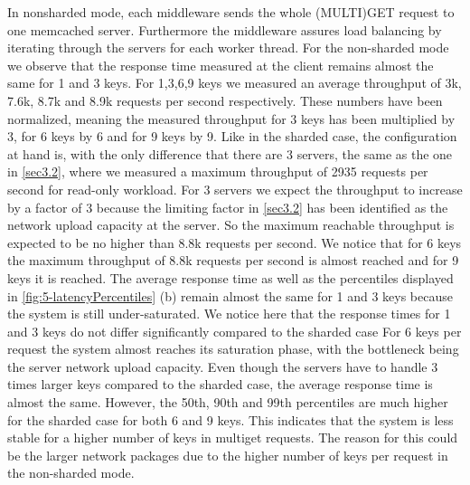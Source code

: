 \documentclass[11pt,a4paper]{article}
\begin{document}
In nonsharded mode, each middleware sends the whole (MULTI)GET request to one memcached server. Furthermore the middleware assures load balancing by iterating through the servers for each worker thread.
For the non-sharded mode we observe that the response time measured at the client remains almost the same for 1 and 3 keys. For 1,3,6,9 keys we measured an average throughput of 3k, 7.6k, 8.7k and 8.9k requests per second respectively. These numbers have been normalized, meaning the measured throughput for 3 keys has been multiplied by 3, for 6 keys by 6 and for 9 keys by 9.
Like in the sharded case, the configuration at hand is, with the only difference that there are 3 servers, the same as the one in \autoref{sec3.2}, where we measured a maximum throughput of 2935 requests per second for read-only workload. For 3 servers we expect the throughput to increase by a factor of 3 because the limiting factor in \autoref{sec3.2} has been identified as the network upload capacity at the server. So the maximum reachable throughput is expected to be no higher than 8.8k requests per second.
We notice that for 6 keys the maximum throughput of 8.8k requests per second is almost reached and for 9 keys it is reached.
The average response time as well as the percentiles displayed in \autoref{fig:5-latencyPercentiles} (b) remain almost the same for 1 and 3 keys because the system is still under-saturated. We notice here that the response times for 1 and 3 keys do not differ significantly compared to the sharded case
For 6 keys per request the system almost reaches its saturation phase, with the bottleneck being the server network upload capacity. Even though the servers have to handle 3 times larger keys compared to the sharded case, the average response time is almost the same. However, the 50th, 90th and 99th percentiles are much higher for the sharded case for both 6 and 9 keys. This indicates that the system is less stable for a higher number of keys in multiget requests. The reason for this could be the larger network packages due to the higher number of keys per request in the non-sharded mode.
\end{document}

